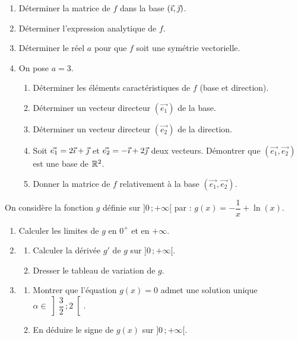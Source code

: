 \documentclass[11pt]{article}
\begin{document}
\begin{enumerate}
  \item Déterminer la matrice de $f$ dans la base $(\vec{\imath},\vec{\jmath})$.
  \item Déterminer l'expression analytique de $f$.
  \item Déterminer le réel $a$ pour que $f$ soit une symétrie vectorielle.
  \item On pose $a = 3$.
  \begin{enumerate}[label=\alph*.]
    \item Déterminer les éléments caractéristiques de $f$ (base et direction).
    \item Déterminer un vecteur directeur $(\vec{e_1})$ de la base.
    \item Déterminer un vecteur directeur $(\vec{e_2})$ de la direction.
    \item Soit $\vec{e_1} = 2\vec{\imath} + \vec{\jmath}$ et $\vec{e_2} = -\vec{\imath} + 2\vec{\jmath}$ deux vecteurs. Démontrer que $(\vec{e_1},\vec{e_2})$ est une base de $\mathbb{R}^2$.
    \item Donner la matrice de $f$ relativement à la base $(\vec{e_1},\vec{e_2})$.
  \end{enumerate}
\end{enumerate}


On considère la fonction $g$ définie sur $]0\,;+\infty[$ par : $g(x) = -\dfrac{1}{x} + \ln(x)$.

\begin{enumerate}
  \item Calculer les limites de $g$ en $0^+$ et en $+\infty$.
  \item \begin{enumerate}[label=\alph*.]
    \item Calculer la dérivée $g'$ de $g$ sur $]0\,;+\infty[$.
    \item Dresser le tableau de variation de $g$.
  \end{enumerate}
  \item \begin{enumerate}[label=\alph*.]
    \item Montrer que l'équation $g(x) = 0$ admet une solution unique $\alpha \in \left]\dfrac{3}{2}\,;2\right[$.
    \item En déduire le signe de $g(x)$ sur $]0\,;+\infty[$.
  \end{enumerate}
\end{enumerate}
\end{document}
